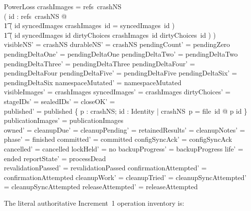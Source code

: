 \documentclass{article}
\begin{document}
\begin{schema}{PowerLoss}
	\dom crashImages = refs~crashNS \\
	( \forall id : refs~crashNS @ \\
	\t1 ( id \in \dom syncedImages \land crashImages~id = syncedImages~id ) \lor \\
	\t1 ( id \notin \dom syncedImages \land id \in \dom dirtyChoices \land
	crashImages~id \in dirtyChoices~id ) ) \\
	visibleNS' = crashNS \land durableNS' = crashNS \land pendingCount' = pendingZero \\
	pendingDeltaOne' = pendingDeltaOne \land pendingDeltaTwo' = pendingDeltaTwo \land
	pendingDeltaThree' = pendingDeltaThree \land
	pendingDeltaFour' = pendingDeltaFour \land
	pendingDeltaFive' = pendingDeltaFive \land pendingDeltaSix' = pendingDeltaSix \land
	namespaceMutated' = namespaceMutated \\
	visibleImages' = crashImages \land syncedImages' = crashImages \land
	dirtyChoices' = \emptyset \\
	stageIDs' = \emptyset \land sealedIDs' = \emptyset \land closeOK' = \emptyset \\
	published' = published \cap \{ p : \dom crashNS; id : Identity |
	crashNS~p = file~id @ p \mapsto id \} \land
	publicationImages' = publicationImages \\
	owned' = \emptyset \land cleanupDue' = \emptyset \land
	cleanupPending' = \emptyset \land retainedResults' = \emptyset \land
	cleanupNotes' = \emptyset \\
	phase' = finished \land committed' = committed \land
	configSyncAck' = configSyncAck \land cancelled' = cancelled \land
	lockHeld' = no \land backupProgress' = backupProgress \land
	life' = ended \land reportState' = processDead \\
	revalidationPassed' = revalidationPassed \land
	confirmationAttempted' = confirmationAttempted \land
	cleanupWork' = \emptyset \land cleanupTried' = \emptyset \land
	cleanupSyncAttempted' = cleanupSyncAttempted \land releaseAttempted' = releaseAttempted
\end{schema}

The literal authoritative Increment~1 operation inventory is:
\end{document}
